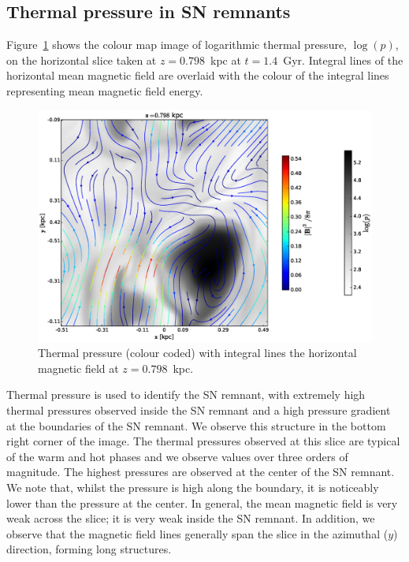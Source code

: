 \documentclass[useAMS,usenatbib]{mn2e}
\begin{document}
\subsection{Thermal pressure in SN remnants}
Figure~\ref{fig:thp_800} shows the colour map image of logarithmic thermal pressure, $\log(p)$, on the horizontal slice taken at $z=0.798$~kpc at $t=1.4$~Gyr. Integral lines of the horizontal mean magnetic field are overlaid with the colour of the integral lines representing mean magnetic field energy.
\begin{figure}
\includegraphics[width = \linewidth]{fig/pp_slice_800pc.eps}
\caption{Thermal pressure (colour coded) with integral lines the horizontal magnetic field at $z=0.798$~kpc.}
\label{fig:thp_800}
\end{figure}
Thermal pressure is used to identify the SN remnant, with extremely high thermal pressures observed inside the SN remnant and a high pressure gradient at the boundaries of the SN remnant. We observe this structure in the bottom right corner of the image. The thermal pressures observed at this slice are typical of the warm and hot phases and we observe values over three orders of magnitude. The highest pressures are observed at the center of the SN remnant. We note that, whilst the pressure is high along the boundary, it is noticeably lower than the pressure at the center. In general, the mean magnetic field is very weak across the slice; it is very weak inside the SN remnant. In addition, we observe that the magnetic field lines generally span the slice in the azimuthal ($y$) direction, forming long structures.
\end{document}
